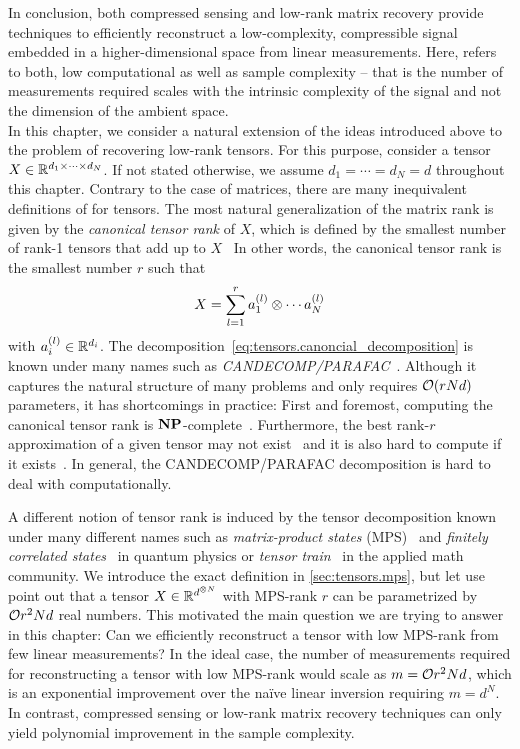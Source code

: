 In conclusion, both compressed sensing and low-rank matrix recovery provide techniques to efficiently reconstruct a low-complexity, compressible signal embedded in a higher-dimensional space from linear measurements.
Here,  refers to both, low computational as well as sample complexity -- that is the number of measurements required scales with the intrinsic complexity of the signal and not the dimension of the ambient space.\\



In this chapter, we consider a natural extension of the ideas introduced above to the problem of recovering low-rank tensors.
For this purpose, consider a tensor $X \in {\mathbb{R}}^{d_1 \times \cdots \times d_N}$.
If not stated otherwise, we assume $d_1 = \cdots = d_N = d$ throughout this chapter.
Contrary to the case of matrices, there are many inequivalent definitions of  for tensors.
The most natural generalization of the matrix rank is given by the \emph{canonical tensor rank} of $X$, which is defined by the smallest number of rank-1 tensors that add up to $X$~\cite{Kolda_2009_Tensor}
In other words, the canonical tensor rank is the smallest number $r$ such that
\[
  X = \sum_{l=1}^r a^{(l)}_1 \otimes \cdots a^{(l)}_N
  \label{eq:tensors.canonical_decomposition}
\]
with $a^{(l)}_i \in {\mathbb{R}}^{d_i}$.
The decomposition~\eqref{eq:tensors.canoncial_decomposition} is known under many names such as \emph{CANDECOMP/PARAFAC}~\cite{Kolda_2009_Tensor}.
Although it captures the natural structure of many problems and only requires ${\mathcal{O}}(r N d)$ parameters, it has shortcomings in practice:
First and foremost, computing the canonical tensor rank is $\mathbf{NP}$-complete~\cite{Hastad_1990_Tensor}.
Furthermore, the best rank-$r$ approximation of a given tensor may not exist~\cite{Kolda_2009_Tensor} and it is also hard to compute if it exists~\cite{Hillar_2013_Most}.
In general, the CANDECOMP/PARAFAC decomposition is hard to deal with computationally.

A different notion of tensor rank is induced by the tensor decomposition known under many different names such as \emph{matrix-product states} (MPS)~\cite{Garcia_2006_Matrix,Verstraete_2008_Matrix,Orus_2014_Practical} and \emph{finitely correlated states}~\cite{Fannes_1992_Finitely} in quantum physics or \emph{tensor train}~\cite{Oseledets_2011_TensorTrain} in the applied math community.
We introduce the exact definition in \cref{sec:tensors.mps}, but let use point out that a tensor $X \in {\mathbb{R}}^{d^{\otimes N}}$ with MPS-rank $r$ can be parametrized by ${\mathcal{O}}{r^2 N d}$ real numbers.
This motivated the main question we are trying to answer in this chapter:
Can we efficiently reconstruct a tensor with low MPS-rank from few linear measurements?
In the ideal case, the number of measurements required for reconstructing a tensor with low MPS-rank would scale as $m = {\mathcal{O}}{r^2 N d}$, which is an exponential improvement over the naïve linear inversion requiring $m = d^N$.
In contrast, compressed sensing or low-rank matrix recovery techniques can only yield polynomial improvement in the sample complexity.


